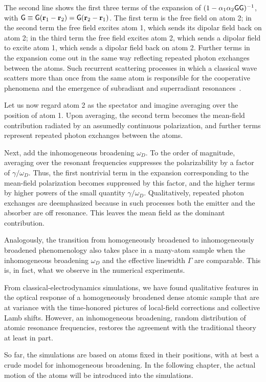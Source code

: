 The second line shows the first three terms of the expansion of $(1-\alpha_1\alpha_2{\sf G}{\sf G})^{-1}$, with ${\sf G}\equiv{\sf G}({\bf r}_1-{\bf r}_2)={\sf G}({\bf r}_2-{\bf r}_1)$. The first term is the free field on atom 2; in the second term the free field excites atom 1, which sends its dipolar field back on atom 2; in the third term the free field excites atom 2, which sends a dipolar field to excite atom 1, which sends a dipolar field back on atom 2. Further terms in the expansion come out in the same way reflecting repeated photon exchanges between the atoms. Such recurrent scattering processes in which a classical wave scatters more than once from the same atom is responsible for the cooperative phenomena and the emergence of subradiant and superradiant resonances~\cite{PhysRevA.55.513,PhysRevA.86.031602,PhysRevB.86.085116}.

Let us now regard atom 2 as the spectator and imagine averaging over the position of atom 1. Upon averaging, the second term becomes the mean-field contribution radiated by an assumedly continuous polarization, and further terms represent repeated photon exchanges between the atoms. 

Next, add the inhomogeneous broadening $\omega_D$. To the order of magnitude, averaging over the resonant frequencies suppresses the polarizability by a factor of $\gamma/\omega_D$. Thus, the first nontrivial term in the expansion corresponding to the mean-field polarization becomes suppressed by this factor, and the higher terms by higher powers of the small quantity $\gamma/\omega_D$. Qualitatively, repeated photon exchanges are deemphasized because in such processes both the emitter and the absorber are off resonance. This leaves the mean field as the dominant contribution.

Analogously, the transition from homogeneously broadened to inhomogeneously broadened phenomenology also takes place in a many-atom sample when the inhomogeneous broadening $\omega_D$ and the effective linewidth $\Gamma$ are comparable. This is, in fact, what we observe in the numerical experiments.

From classical-electrodynamics simulations, we have found qualitative features in the optical response of a homogeneously broadened dense atomic sample that are at variance with the time-honored pictures of local-field corrections and collective Lamb shifts. However, an inhomogeneous broadening, random distribution of atomic resonance frequencies, restores the agreement with the traditional theory at least in part.

So far, the simulations are based on atoms fixed in their positions, with at best a crude model for inhomogeneous broadening. In the following chapter, the actual motion of the atoms will be introduced into the simulations.

